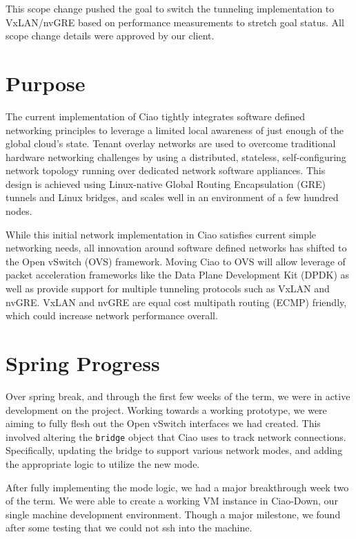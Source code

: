\documentclass[10pt,onecolumn,journal,draftclsnofoot]{IEEEtran}
\begin{document}
This scope change pushed the goal to switch the tunneling implementation to
VxLAN/nvGRE based on performance measurements to stretch goal status. All scope
change details were approved by our client.

\section{Purpose}

The current implementation of Ciao tightly integrates software defined
networking principles to leverage a limited local awareness of just enough of
the global cloud's state. Tenant overlay networks are used to overcome
traditional hardware networking challenges by using a distributed, stateless,
self-configuring network topology running over dedicated network software
appliances. This design is achieved using Linux-native Global Routing
Encapsulation (GRE) tunnels and Linux bridges, and scales well in an environment
of a few hundred nodes.

While this initial network implementation in Ciao satisfies current simple
networking needs, all innovation around software defined networks has
shifted to the Open vSwitch (OVS) framework. Moving Ciao to OVS will allow
leverage of packet acceleration frameworks like the Data Plane Development Kit
(DPDK) as well as provide support for multiple tunneling protocols such as VxLAN
and nvGRE. VxLAN and nvGRE are equal cost multipath routing (ECMP) friendly,
which could increase network performance overall.

\section{Spring Progress}
Over spring break, and through the first few weeks of the term, we were in active
development on the project. Working towards a working prototype, we were aiming
to fully flesh out the Open vSwitch interfaces we had created. This involved
altering the \texttt{bridge} object that Ciao uses to track network connections.
Specifically, updating the bridge to support various network modes, and adding
the appropriate logic to utilize the new mode.

After fully implementing the mode logic, we had a major breakthrough week two
of the term. We were able to create a working VM instance in Ciao-Down,
our single machine development environment. Though a major milestone, we found
after some testing that we could not ssh into the machine.
\end{document}
